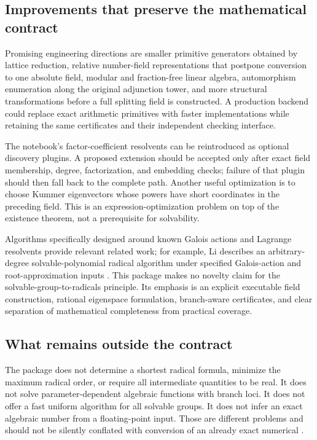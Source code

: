 \documentclass[11pt,letterpaper]{article}
\theoremstyle{definition}\newtheorem{definition}[theorem]{Definition}
\theoremstyle{remark}\newtheorem{remark}[theorem]{Remark}
\newcommand{\code}[1]{\texttt{\detokenize{#1}}}
\begin{document}
\subsection{Improvements that preserve the mathematical contract}
Promising engineering directions are smaller primitive generators obtained by lattice reduction, relative number-field representations that postpone conversion to one absolute field, modular and fraction-free linear algebra, automorphism enumeration along the original adjunction tower, and more structural transformations before a full splitting field is constructed. A production backend could replace exact arithmetic primitives with faster implementations while retaining the same certificates and their independent checking interface.

The notebook's factor-coefficient resolvents can be reintroduced as optional discovery plugins. A proposed extension should be accepted only after exact field membership, degree, factorization, and embedding checks; failure of that plugin should then fall back to the complete path. Another useful optimization is to choose Kummer eigenvectors whose powers have short coordinates in the preceding field. This is an expression-optimization problem on top of the existence theorem, not a prerequisite for solvability.

Algorithms specifically designed around known Galois actions and Lagrange resolvents provide relevant related work; for example, Li describes an arbitrary-degree solvable-polynomial radical algorithm under specified Galois-action and root-approximation inputs \cite{li}. This package makes no novelty claim for the solvable-group-to-radicals principle. Its emphasis is an explicit executable field construction, rational eigenspace formulation, branch-aware certificates, and clear separation of mathematical completeness from practical coverage.

\subsection{What remains outside the contract}
The package does not determine a shortest radical formula, minimize the maximum radical order, or require all intermediate quantities to be real. It does not solve parameter-dependent algebraic functions with branch loci. It does not offer a fast uniform algorithm for all solvable groups. It does not infer an exact algebraic number from a floating-point input. Those are different problems and should not be silently conflated with conversion of an already exact numerical \code{Root}.
\end{document}
